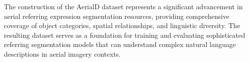 The construction of the AerialD dataset represents a significant advancement in aerial referring expression segmentation resources, providing comprehensive coverage of object categories, spatial relationships, and linguistic diversity. The resulting dataset serves as a foundation for training and evaluating sophisticated referring segmentation models that can understand complex natural language descriptions in aerial imagery contexts.



